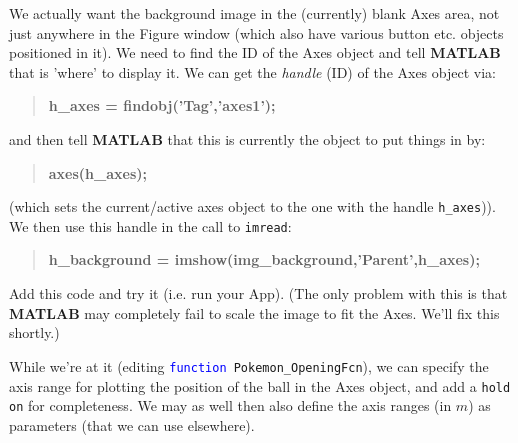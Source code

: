 \documentclass{tufte-book} %
\newenvironment{docspecbold}{\begin{quotation}\ttfamily\bfseries\parskip0pt\parindent0pt\ignorespaces}{\end{quotation}}
\begin{document}
We actually want the background image in the (currently) blank \textsf{Axes} area, not just anywhere in the \textsf{Figure window} (which also have various button etc. objects positioned in it). We need to find the ID of the \textsf{Axes} object and tell \textbf{MATLAB} that is 'where' to display it. We can get the \textit{handle} (ID) of the \textsf{Axes} object via:
\begin{docspecbold}
h\_axes = findobj(\textcolor[rgb]{0.501961,0,1}{'Tag'},\textcolor[rgb]{0.501961,0,1}{'axes1'});
\end{docspecbold}
and then tell \textbf{MATLAB} that this is currently the object to put things in by:
\begin{docspecbold}
axes(h\_axes);
\end{docspecbold}
(which sets the current/active axes object to the one with the handle \texttt{h\_axes})).
We then use this handle in the call to \texttt{imread}:
\begin{docspecbold}
h\_background = imshow(img\_background,\textcolor[rgb]{0.501961,0,1}{'Parent'},h\_axes);
\end{docspecbold}
Add this code and try it (i.e. run your App). (The only problem with this is that \textbf{MATLAB} may completely fail to scale the image to fit the \textsf{Axes}. We'll fix this shortly.)

While we're at it (editing \texttt{\textcolor{blue}{function} Pokemon\_OpeningFcn}), we can specify the axis range for plotting the position of the ball in the Axes object, and add a \texttt{hold on} for completeness. We may as well then also define the axis ranges (in \(m\)) as parameters (that we can use elsewhere).
\end{document}
